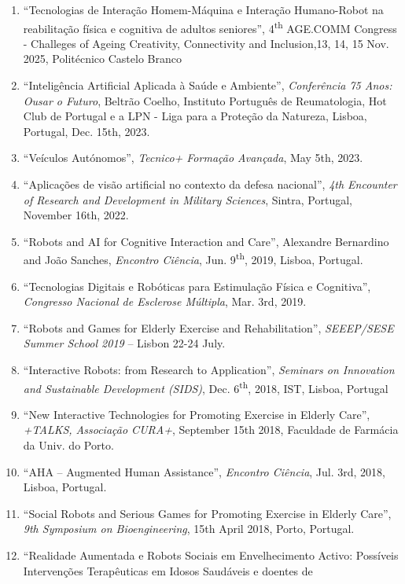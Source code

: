 \documentclass[
]{article}
\begin{document}
\begin{enumerate}
\def\labelenumi{\arabic{enumi}.}
\item
  ``Tecnologias de Interação Homem-Máquina e Interação Humano-Robot na
  reabilitação física e cognitiva de adultos seniores'',
  4\textsuperscript{th} AGE.COMM Congress - Challeges of Ageing
  Creativity, Connectivity and Inclusion,13, 14, 15 Nov. 2025,
  Politécnico Castelo Branco
\item
  ``Inteligência Artificial Aplicada à Saúde e Ambiente'',
  \emph{Conferência 75 Anos: Ousar o Futuro}, Beltrão Coelho, Instituto
  Português de Reumatologia, Hot Club de Portugal e a LPN - Liga para a
  Proteção da Natureza, Lisboa, Portugal, Dec. 15th, 2023.
\item
  ``Veículos Autónomos'', \emph{Tecnico+ Formação Avançada}, May 5th,
  2023.
\item
  ``Aplicações de visão artificial no contexto da defesa nacional'',
  \emph{4th Encounter of Research and Development in Military Sciences},
  Sintra, Portugal, November 16th, 2022.
\item
  ``Robots and AI for Cognitive Interaction and Care'', Alexandre
  Bernardino and João Sanches, \emph{Encontro Ciência}, Jun.
  9\textsuperscript{th}, 2019, Lisboa, Portugal.
\item
  ``Tecnologias Digitais e Robóticas para Estimulação Física e
  Cognitiva'', \emph{Congresso Nacional de Esclerose Múltipla}, Mar.
  3rd, 2019.
\item
  ``Robots and Games for Elderly Exercise and Rehabilitation'',
  \emph{SEEEP/SESE Summer School 2019} -- Lisbon 22-24 July.
\item
  ``Interactive Robots: from Research to Application'', \emph{Seminars
  on Innovation and Sustainable Development (SIDS)}, Dec.
  6\textsuperscript{th}, 2018, IST, Lisboa, Portugal
\item
  ``New Interactive Technologies for Promoting Exercise in Elderly
  Care'', \emph{+TALKS, Associação CURA+}, September 15th 2018,
  Faculdade de Farmácia da Univ. do Porto.
\item
  ``AHA -- Augmented Human Assistance'', \emph{Encontro Ciência}, Jul.
  3rd, 2018, Lisboa, Portugal.
\item
  ``Social Robots and Serious Games for Promoting Exercise in Elderly
  Care'', \emph{9th Symposium on Bioengineering}, 15th April 2018,
  Porto, Portugal.
\item
  ``Realidade Aumentada e Robots Sociais em Envelhecimento Activo:
  Possíveis Intervenções Terapêuticas em Idosos Saudáveis e doentes de

\end{enumerate}
\end{document}
